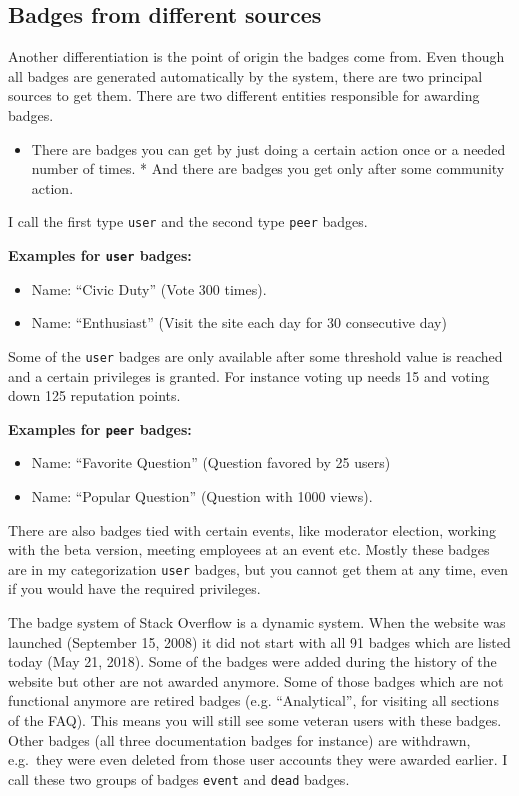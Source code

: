 \documentclass[]{book}
\providecommand{\tightlist}{%
  \setlength{\itemsep}{0pt}\setlength{\parskip}{0pt}}
\theoremstyle{definition}
\theoremstyle{definition}
\theoremstyle{definition}
\theoremstyle{remark}
\begin{document}
\subsection{Badges from different
sources}\label{badges-from-different-sources}

Another differentiation is the point of origin the badges come from.
Even though all badges are generated automatically by the system, there
are two principal sources to get them. There are two different entities
responsible for awarding badges.

\begin{itemize}
\tightlist
\item
  There are badges you can get by just doing a certain action once or a
  needed number of times. * And there are badges you get only after some
  community action.
\end{itemize}

I call the first type \texttt{user} and the second type \texttt{peer}
badges.

\textbf{Examples for \texttt{user} badges:}

\begin{itemize}
\tightlist
\item
  Name: ``Civic Duty'' (Vote 300 times).
\item
  Name: ``Enthusiast'' (Visit the site each day for 30 consecutive day)
\end{itemize}

Some of the \texttt{user} badges are only available after some threshold
value is reached and a certain privileges is granted. For instance
voting up needs 15 and voting down 125 reputation points.

\textbf{Examples for \texttt{peer} badges:}

\begin{itemize}
\tightlist
\item
  Name: ``Favorite Question'' (Question favored by 25 users)
\item
  Name: ``Popular Question'' (Question with 1000 views).
\end{itemize}

There are also badges tied with certain events, like moderator election,
working with the beta version, meeting employees at an event etc. Mostly
these badges are in my categorization \texttt{user} badges, but you
cannot get them at any time, even if you would have the required
privileges.

The badge system of Stack Overflow is a dynamic system. When the website
was launched (September 15, 2008) it did not start with all 91 badges
which are listed today (May 21, 2018). Some of the badges were added
during the history of the website but other are not awarded anymore.
Some of those badges which are not functional anymore are retired badges
(e.g. ``Analytical'', for visiting all sections of the FAQ). This means
you will still see some veteran users with these badges. Other badges
(all three documentation badges for instance) are withdrawn, e.g.~they
were even deleted from those user accounts they were awarded earlier. I
call these two groups of badges \texttt{event} and \texttt{dead} badges.
\end{document}
